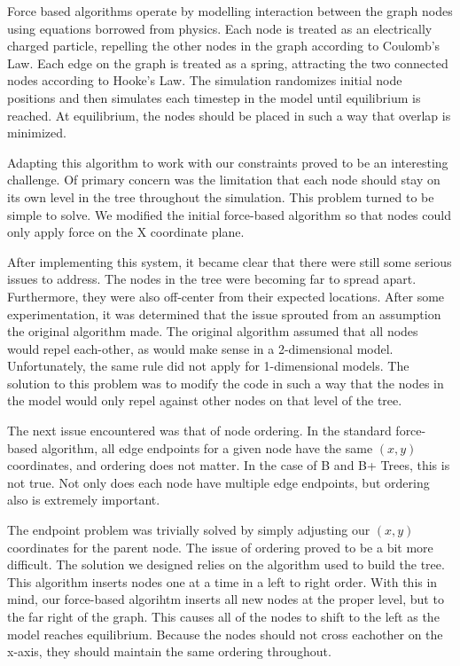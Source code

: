 Force based algorithms operate by modelling interaction between the
graph nodes using equations borrowed from physics. Each node is
treated as an electrically charged particle, repelling the other nodes
in the graph according to Coulomb's Law. Each edge on the graph is
treated as a spring, attracting the two connected nodes according to
Hooke's Law. The simulation randomizes initial node positions and then
simulates each timestep in the model until equilibrium is reached. At
equilibrium, the nodes should be placed in such a way that overlap is
minimized.

Adapting this algorithm to work with our constraints proved to be an
interesting challenge. Of primary concern was the limitation that each
node should stay on its own level in the tree throughout the
simulation. This problem turned to be simple to solve. We modified the
initial force-based algorithm so that nodes could only apply force on
the X coordinate plane.

After implementing this system, it became clear that there were still
some serious issues to address. The nodes in the tree were becoming
far to spread apart. Furthermore, they were also off-center from their
expected locations. After some experimentation, it was determined that
the issue sprouted from an assumption the original algorithm made. The
original algorithm assumed that all nodes would repel each-other, as
would make sense in a 2-dimensional model. Unfortunately, the same
rule did not apply for 1-dimensional models. The solution to this
problem was to modify the code in such a way that the nodes in the
model would only repel against other nodes on that level of the tree.

The next issue encountered was that of node ordering. In the
standard force-based algorithm, all edge endpoints for a given node
have the same $(x,y)$ coordinates, and ordering does not matter. In
the case of B and B+ Trees, this is not true. Not only does each node
have multiple edge endpoints, but ordering also is extremely
important.

The endpoint problem was trivially solved by simply adjusting our
$(x,y)$ coordinates for the parent node. The issue of ordering proved
to be a bit more difficult. The solution we designed relies on the
algorithm used to build the tree. This algorithm inserts nodes one at
a time in a left to right order. With this in mind, our force-based
algorihtm inserts all new nodes at the proper level, but to the far
right of the graph. This causes all of the nodes to shift to the left
as the model reaches equilibrium. Because the nodes should not cross
eachother on the x-axis, they should maintain the same ordering throughout.
